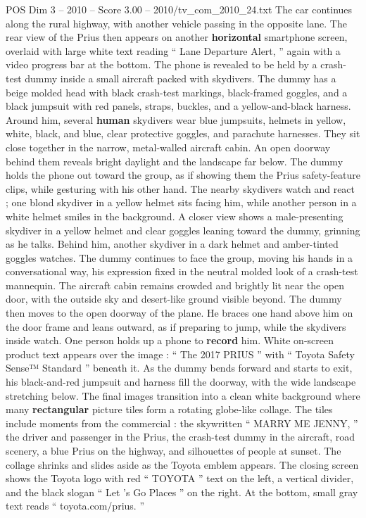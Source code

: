 \begin{textsample}{POS Dim 3 – 2010 – Score 3.00 – 2010/tv\_com\_2010\_24.txt}
The car continues along the rural highway, with another vehicle passing in the opposite lane.
The rear view of the Prius then appears on another \textbf{horizontal} smartphone screen, overlaid with large white text reading “ Lane Departure Alert, ” again with a video progress bar at the bottom.
The phone is revealed to be held by a crash-test dummy inside a small aircraft packed with skydivers.
The dummy has a beige molded head with black crash-test markings, black-framed goggles, and a black jumpsuit with red panels, straps, buckles, and a yellow-and-black harness.
Around him, several \textbf{human} skydivers wear blue jumpsuits, helmets in yellow, white, black, and blue, clear protective goggles, and parachute harnesses.
They sit close together in the narrow, metal-walled aircraft cabin.
An open doorway behind them reveals bright daylight and the landscape far below.
The dummy holds the phone out toward the group, as if showing them the Prius safety-feature clips, while gesturing with his other hand.
The nearby skydivers watch and react ; one blond skydiver in a yellow helmet sits facing him, while another person in a white helmet smiles in the background.
A closer view shows a male-presenting skydiver in a yellow helmet and clear goggles leaning toward the dummy, grinning as he talks.
Behind him, another skydiver in a dark helmet and amber-tinted goggles watches.
The dummy continues to face the group, moving his hands in a conversational way, his expression fixed in the neutral molded look of a crash-test mannequin.
The aircraft cabin remains crowded and brightly lit near the open door, with the outside sky and desert-like ground visible beyond.
The dummy then moves to the open doorway of the plane.
He braces one hand above him on the door frame and leans outward, as if preparing to jump, while the skydivers inside watch.
One person holds up a phone to \textbf{record} him.
White on-screen product text appears over the image : “ The 2017 PRIUS ” with “ Toyota Safety Sense{\EmojiFont ™} Standard ” beneath it.
As the dummy bends forward and starts to exit, his black-and-red jumpsuit and harness fill the doorway, with the wide landscape stretching below.
The final images transition into a clean white background where many \textbf{rectangular} picture tiles form a rotating globe-like collage.
The tiles include moments from the commercial : the skywritten “ MARRY ME JENNY, ” the driver and passenger in the Prius, the crash-test dummy in the aircraft, road scenery, a blue Prius on the highway, and silhouettes of people at sunset.
The collage shrinks and slides aside as the Toyota emblem appears.
The closing screen shows the Toyota logo with red “ TOYOTA ” text on the left, a vertical divider, and the black slogan “ Let ’s Go Places ” on the right.
At the bottom, small gray text reads “ toyota.com/prius. ”

\end{textsample}
